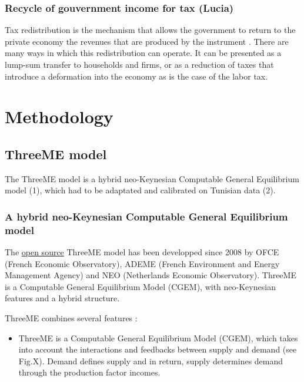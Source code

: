 \documentclass[
]{article}
\providecommand{\tightlist}{%
  \setlength{\itemsep}{0pt}\setlength{\parskip}{0pt}}
\begin{document}
\hypertarget{recycle-of-gouvernment-income-for-tax-lucia}{%
\subsubsection{Recycle of gouvernment income for tax
(Lucia)}\label{recycle-of-gouvernment-income-for-tax-lucia}}

Tax redistribution is the mechanism that allows the government to return
to the private economy the revenues that are produced by the instrument
\autocite{goulder}. There are many ways in which this redistribution can
operate. It can be presented as a lump-sum transfer to households and
firms, or as a reduction of taxes that introduce a deformation into the
economy as is the case of the labor tax.

\hypertarget{methodology}{%
\section{Methodology}\label{methodology}}

\hypertarget{threeme-model}{%
\subsection{ThreeME model}\label{threeme-model}}

The ThreeME model is a hybrid neo-Keynesian Computable General
Equilibrium model (1), which had to be adaptated and calibrated on
Tunisian data (2).

\hypertarget{a-hybrid-neo-keynesian-computable-general-equilibrium-model}{%
\subsubsection{A hybrid neo-Keynesian Computable General Equilibrium
model}\label{a-hybrid-neo-keynesian-computable-general-equilibrium-model}}

The \href{https://github.com/fosem/ThreeME_V3-open}{open source} ThreeME
model has been developped since 2008 by OFCE (French Economic
Observatory), ADEME (French Environment and Energy Management Agency)
and NEO (Netherlands Economic Observatory). ThreeME is a Computable
General Equilibrium Model (CGEM), with neo-Keynesian features and a
hybrid structure.

ThreeME combines several features \autocites[
]{callonnec2013}{callonnec2021} :

\begin{itemize}
\tightlist
\item
  ThreeME is a Computable General Equilibrium Model (CGEM), which takes
  into account the interactions and feedbacks between supply and demand
  (see Fig.X). Demand defines supply and in return, supply determines
  demand through the production factor incomes.
\end{itemize}
\end{document}
